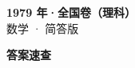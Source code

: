 \documentclass[zihao=-4, a4paper]{ctexart}
\begin{document}
\begin{center}
  {\Large\bfseries 1979 年·全国卷（理科）}\\[4pt]
  {\large 数学 · 简答版}
\end{center}
\medskip
{}

\clearpage
{}
\begin{center}{\Large\bfseries 答案速查}\end{center}
\medskip

\end{document}
